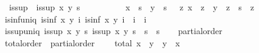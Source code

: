 \begin{isabellebody}
\isanewline
{}\isamarkupfalse%
\isanewline
\ \ is{\isacharunderscore}{\kern0pt}sup\ \ {\isachardoublequoteopen}is{\isacharunderscore}{\kern0pt}sup\ x\ y\ s\ {\isacharequal}{\kern0pt}\isanewline
\ \ \ \ \ \ \ \ \ {\isacharparenleft}{\kern0pt}x\ {\isasymsqsubseteq}\ s\ {\isasymand}\ y\ {\isasymsqsubseteq}\ s\ {\isasymand}\ {\isacharparenleft}{\kern0pt}{\isasymforall}\ z{\isachardot}{\kern0pt}\ x\ {\isasymsqsubseteq}\ z\ {\isasymand}\ y\ {\isasymsqsubseteq}\ z\ {\isasymlongrightarrow}\ s\ {\isasymsqsubseteq}\ z{\isacharparenright}{\kern0pt}{\isacharparenright}{\kern0pt}{\isachardoublequoteclose}\isanewline
\isanewline
{}\isamarkupfalse%
\ is{\isacharunderscore}{\kern0pt}inf{\isacharunderscore}{\kern0pt}uniq{\isacharcolon}{\kern0pt}\ {\isachardoublequoteopen}{\isasymlbrakk}is{\isacharunderscore}{\kern0pt}inf\ x\ y\ i{\isacharsemicolon}{\kern0pt}\ is{\isacharunderscore}{\kern0pt}inf\ x\ y\ i{\isacharprime}{\kern0pt}{\isasymrbrakk}\ {\isasymLongrightarrow}\ i\ {\isacharequal}{\kern0pt}\ i{\isacharprime}{\kern0pt}{\isachardoublequoteclose}\isanewline
%
\isadelimproof
\ \ %
\endisadelimproof
%
\isatagproof
{}\isamarkupfalse%
%
\endisatagproof
{\isafoldproof}%
%
\isadelimproof
\isanewline
%
\endisadelimproof
{}\isamarkupfalse%
\ is{\isacharunderscore}{\kern0pt}sup{\isacharunderscore}{\kern0pt}uniq{\isacharcolon}{\kern0pt}\ {\isachardoublequoteopen}{\isasymlbrakk}is{\isacharunderscore}{\kern0pt}sup\ x\ y\ s{\isacharsemicolon}{\kern0pt}\ is{\isacharunderscore}{\kern0pt}sup\ x\ y\ s{\isacharprime}{\kern0pt}{\isasymrbrakk}\ {\isasymLongrightarrow}\ s\ {\isacharequal}{\kern0pt}\ s{\isacharprime}{\kern0pt}{\isachardoublequoteclose}\isanewline
%
\isadelimproof
\ \ %
\endisadelimproof
%
\isatagproof
{}\isamarkupfalse%
%
\endisatagproof
{\isafoldproof}%
%
\isadelimproof
\isanewline
%
\endisadelimproof
\isanewline
{}\isamarkupfalse%
\isanewline
\isanewline
{}\isamarkupfalse%
{\isacharbang}{\kern0pt}\ partial{\isacharunderscore}{\kern0pt}order%
\isadelimdocument
%
\endisadelimdocument
%
\isatagdocument
%
\isamarkuptrue%
%
\endisatagdocument
{\isafolddocument}%
%
\isadelimdocument
%
\endisadelimdocument
{}\isamarkupfalse%
\ total{\isacharunderscore}{\kern0pt}order\ {\isacharequal}{\kern0pt}\ partial{\isacharunderscore}{\kern0pt}order\ {\isacharplus}{\kern0pt}\isanewline
\ \ \ total{\isacharcolon}{\kern0pt}\ {\isachardoublequoteopen}x\ {\isasymsqsubseteq}\ y\ {\isasymor}\ y\ {\isasymsqsubseteq}\ x{\isachardoublequoteclose}\isanewline

\end{isabellebody}
